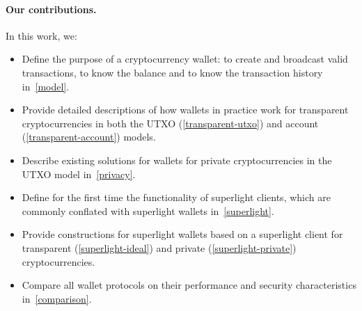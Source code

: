\paragraph{Our contributions.} In this work, we:
\begin{itemize}
    \item Define the purpose of a cryptocurrency wallet: to create and broadcast valid transactions, to know the balance and to know the transaction history in~\cref{model}.
    \item Provide detailed descriptions of how wallets in practice work for transparent cryptocurrencies in both the UTXO (\cref{transparent-utxo}) and account (\cref{transparent-account}) models.
    \item Describe existing solutions for wallets for private cryptocurrencies in the UTXO model in~\cref{privacy}.
    \item Define for the first time the functionality of superlight clients, which are commonly conflated with superlight wallets in~\cref{superlight}.
    \item Provide constructions for superlight wallets based on a superlight client for transparent (\cref{superlight-ideal}) and private (\cref{superlight-private}) cryptocurrencies.
    \item Compare all wallet protocols on their performance and security characteristics in~\cref{comparison}.
\end{itemize}
